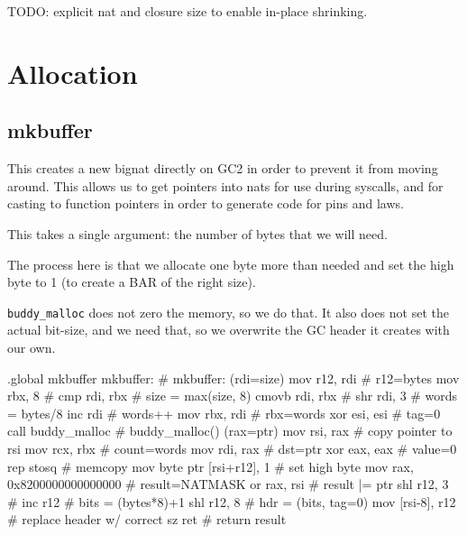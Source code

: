 TODO: explicit nat and closure size to enable in-place shrinking.

\section{Allocation}

\subsection{mkbuffer}

This creates a new bignat directly on GC2 in order to prevent it from
moving around.  This allows us to get pointers into nats for use during
syscalls, and for casting to function pointers in order to generate code
for pins and laws.

This takes a single argument: the number of bytes that we will need.

The process here is that we allocate one byte more than needed and set
the high byte to 1 (to create a BAR of the right size).

\lstinline|buddy_malloc| does not zero the memory, so we do that.  It also
does not set the actual bit-size, and we need that, so we overwrite the
GC header it creates with our own.

\begin{asm}
.global mkbuffer
mkbuffer:                                   # mkbuffer: (rdi=size)
	mov	r12, rdi                    #   r12=bytes
	mov	rbx, 8                      #
	cmp	rdi, rbx                    #   size = max(size, 8)
	cmovb	rdi, rbx                    #
	shr	rdi, 3                      #   words = bytes/8
	inc	rdi                         #   words++
	mov	rbx, rdi                    #   rbx=words
	xor	esi, esi                    #   tag=0
	call	buddy_malloc                #   buddy_malloc() (rax=ptr)
	mov	rsi, rax                    #   copy pointer to rsi
	mov	rcx, rbx                    #   count=words
	mov	rdi, rax                    #   dst=ptr
	xor	eax, eax                    #   value=0
	rep	stosq                       #   memcopy
	mov	byte ptr [rsi+r12], 1       #   set high byte
	mov	rax, 0x8200000000000000     #   result=NATMASK
	or	rax, rsi                    #   result |= ptr
	shl	r12, 3                      #
	inc	r12                         #   bits = (bytes*8)+1
	shl	r12, 8                      #   hdr = (bits, tag=0)
	mov	[rsi-8], r12                #   replace header w/ correct sz
	ret                                 #   return result
\end{asm}

